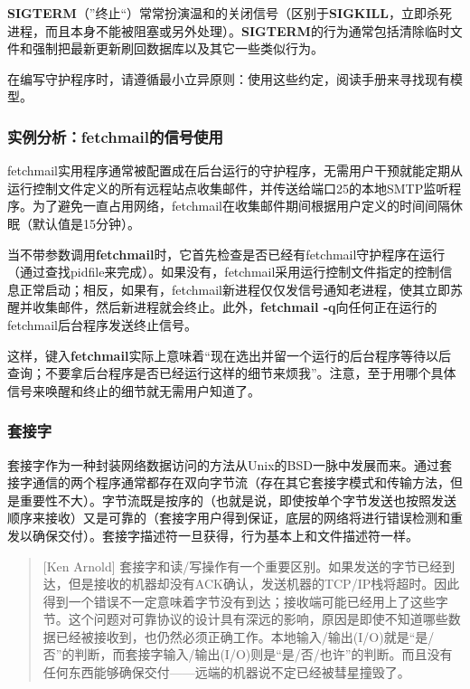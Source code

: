 \documentclass[12pt,oneside]{book}
\begin{document}
\textbf{SIGTERM}（”终止“）常常扮演温和的关闭信号（区别于\textbf{SIGKILL}\linebreak ，立即杀死进程，而且本身不能被阻塞或另外处理）。\textbf{SIGTERM}的行为通常包括清除临时文件和强制把最新更新刷回数据库以及其它一些类似行为。

在编写守护程序时，请遵循最小立异原则：使用这些约定，阅读手册来寻找现有模型。


\subsubsection{实例分析：fetchmail的信号使用}
fetchmail实用程序通常被配置成在后台运行的守护程序，无需用户干预就能定期从运行控制文件定义的所有远程站点收集邮件，并传送给端口25的本地SMTP监听程序。为了避免一直占用网络，fetchmail在收集邮件期间根据用户定义的时间间隔休眠（默认值是15分钟）。

当不带参数调用\textbf{fetchmail}时，它首先检查是否已经有fetchmail守护程序在运行（通过查找pidfile来完成）。如果没有，fetchmail采用运行控制文件指定的控制信息正常启动；相反，如果有，fetchmail新进程仅仅发信号通知老进程，使其立即苏醒并收集邮件，然后新进程就会终止。此外，\textbf{fetchmail -q}向任何正在运行的fetchmail后台程序发送终止信号。

这样，键入\textbf{fetchmail}实际上意味着“现在选出并留一个运行的后台程序等待以后查询；不要拿后台程序是否已经运行这样的细节来烦我”。注意，至于用哪个具体信号来唤醒和终止的细节就无需用户知道了。


\subsubsection{套接字}
套接字作为一种封装网络数据访问的方法从Unix的BSD一脉中发展而来。通过套接字通信的两个程序通常都存在双向字节流（存在其它套接字模式和传输方法，但是重要性不大）。字节流既是按序的（也就是说，即使按单个字节发送也按照发送顺序来接收）又是可靠的（套接字用户得到保证，底层的网络将进行错误检测和重发以确保交付）。套接字描述符一旦获得，行为基本上和文件描述符一样。

\begin{quote}[Ken Arnold]
套接字和读/写操作有一个重要区别。如果发送的字节已经到达，但是接收的机器却没有ACK确认，发送机器的TCP/IP栈将超时。因此得到一个错误不一定意味着字节没有到达；接收端可能已经用上了这些字节。这个问题对可靠协议的设计具有深远的影响，原因是即使不知道哪些数据已经被接收到，也仍然必须正确工作。本地输入/输出(I/O)就是“是/否”的判断，而套接字输入/输出(I/O)则是“是/否/也许”的判断。而且没有任何东西能够确保交付——远端的机器说不定已经被彗星撞毁了。
\end{quote}
\end{document}
